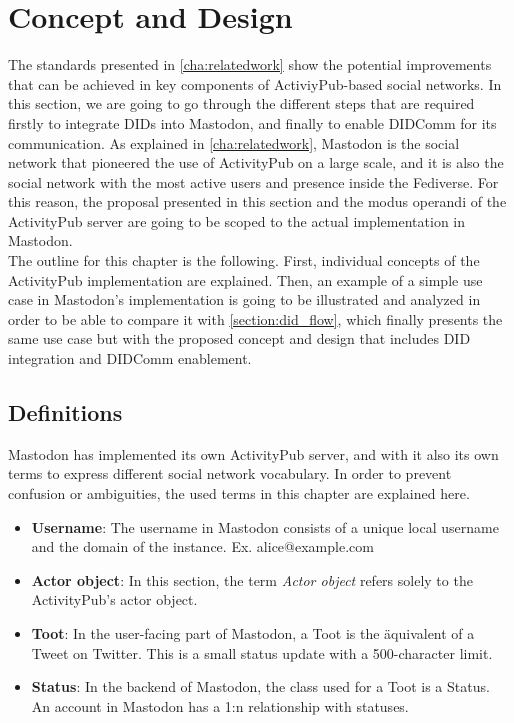 \chapter{Concept and Design}
\label{cha:conceptanddesign}
 
The standards presented in \autoref{cha:relatedwork} show the potential improvements that can be achieved in key components of ActiviyPub-based social networks. In this section, we are going to go through the different steps that are required firstly to integrate DIDs into Mastodon, and finally to enable DIDComm for its communication. As explained in \autoref{cha:relatedwork}, Mastodon is the social network that pioneered the use of ActivityPub on a large scale, and it is also the social network with the most active users and presence inside the Fediverse. For this reason, the proposal presented in this section and the modus operandi of the ActivityPub server are going to be scoped to the actual implementation in Mastodon.\\
The outline for this chapter is the following. First, individual concepts of the ActivityPub implementation are explained. Then, an example of a simple use case in Mastodon's implementation is going to be illustrated and analyzed in order to be able to compare it with \autoref{section:did_flow}, which finally presents the same use case but with the proposed concept and design that includes DID integration and DIDComm enablement.
 
\section{Definitions}
Mastodon has implemented its own ActivityPub server, and with it also its own terms to express different social network vocabulary. In order to prevent confusion or ambiguities, the used terms in this chapter are explained here. 
 
\begin{itemize}
  \item \textbf{Username}: The username in Mastodon consists of a unique local username and the domain of the instance. Ex. alice@example.com
  \item \textbf{Actor object}: In this section, the term \emph{Actor object} refers solely to the ActivityPub's actor object. 
  \item \textbf{Toot}: In the user-facing part of Mastodon, a Toot is the äquivalent of a Tweet on Twitter. This is a small status update with a 500-character limit.
  \item \textbf{Status}: In the backend of Mastodon, the class used for a Toot is a Status. An account in Mastodon has a 1:n relationship with statuses.
\end{itemize}

